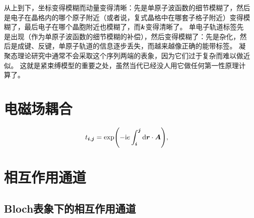 从上到下，坐标变得模糊而动量变得清晰：先是单原子波函数的细节模糊了，然后是电子在晶格内的哪个原子附近（或者说，复式晶格中在哪套子格子附近）变得模糊了，最后电子在哪个晶胞附近也模糊了，而$\vb*{k}$变得清晰了。
单电子轨道标签先是出现（作为单原子波函数的细节模糊的补偿），然后变得模糊了：先是杂化，然后是成键、反键，单原子轨道的信息逐步丢失，而越来越像正确的能带标签。
凝聚态理论研究中通常不会采取这个序列两端的表象，因为它们过于复杂而难以做近似。
这就是紧束缚模型的重要之处，虽然当代已经没人用它做任何第一性原理计算了。

\section{电磁场耦合}


\begin{equation}
    t_{\vb*{i}, \vb*{j}} = \exp(- \mathrm{i} e \int_{\vb*{i}}^{\vb*{j}} \dd{\vb*{r}} \cdot \vb*{A}),
\end{equation}

\section{相互作用通道}

\subsection{Bloch表象下的相互作用通道}\label{sec:interaction-bloch}

